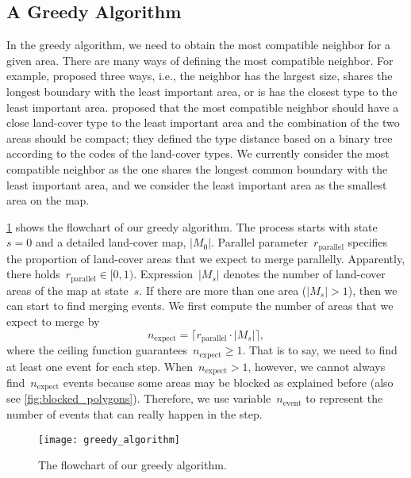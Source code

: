 \documentclass[ijgi,article,submit,moreauthors,pdftex]{Definitions/mdpi}
\begin{document}
\subsection{A Greedy Algorithm}
\label{sec:greedy_algo}

In the greedy algorithm, we need to obtain the most compatible neighbor 
for a given area.
There are many ways of defining the most compatible neighbor.
For example, \citet{Cheng2006} proposed three ways, i.e.,
the neighbor has the largest size, 
shares the longest boundary with the least important area,
or is has the closest type to the least important area. 
\citet{Peng2017AStar} proposed that 
the most compatible neighbor should have a close land-cover type
to the least important area
and the combination of the two areas should be compact;
they defined the type distance based on a binary tree
according to the codes of the land-cover types.
We currently consider the most compatible neighbor
as the one shares the longest common boundary 
with the least important area,
and we consider the least important area 
as the smallest area on the map.

\fig\ref{fig:greedy_framework} shows the flowchart of our greedy algorithm.
The process starts with state~$s=0$ and a detailed land-cover map, $|M_0|$.
Parallel parameter~$r_\mathrm{parallel}$ specifies 
the proportion of land-cover areas that
we expect to merge parallelly.
Apparently, there holds~$r_\mathrm{parallel} \in [0,1)$.
Expression~$|M_s|$ denotes the number of land-cover areas of the map at state~$s$.
If there are more than one area ($|M_s|>1$),
then we can start to find merging events.
We first compute the number of areas that we expect to merge by
\begin{equation}
\label{eq:n_expect}
n_\mathrm{expect} =
\lceil r_\mathrm{parallel} \cdot |M_s| \rceil,
\end{equation}
where the ceiling function guarantees~$n_\mathrm{expect}\ge 1$.
That is to say, we need to find at least one event for each step.
When~$n_\mathrm{expect} > 1$, however,
we cannot always find~$n_\mathrm{expect}$ events
because some areas may be blocked as explained before
(also see \fig\ref{fig:blocked_polygons}).
Therefore, we use variable~$n_\mathrm{event}$
to represent the number of events that can really happen in the step. 


\begin{figure}[tb]
\centering
\texttt{[image: greedy\_algorithm]}
\caption{The flowchart of our greedy algorithm.
}
\label{fig:greedy_framework}
\end{figure}
\end{document}
